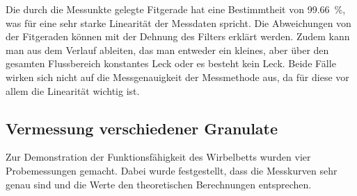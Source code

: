 \begin{figure}[H]
\end{figure}




Die durch die Messunkte gelegte Fitgerade hat eine Bestimmtheit von \SI{99,66}{\%}, was für eine sehr starke Linearität der Messdaten spricht. Die Abweichungen von der Fitgeraden können mit der Dehnung des Filters erklärt werden. Zudem kann man aus dem Verlauf ableiten, das man entweder ein kleines, aber über den gesamten Flussbereich konstantes Leck oder es besteht kein Leck. Beide Fälle wirken sich nicht auf die Messgenauigkeit der Messmethode aus, da für diese vor allem die Linearität wichtig ist. 


\subsection{Vermessung verschiedener Granulate}

Zur Demonstration der Funktionsfähigkeit des Wirbelbetts wurden vier Probemessungen gemacht. Dabei wurde festgestellt, dass die Messkurven sehr genau sind und die Werte den theoretischen Berechnungen entsprechen.

